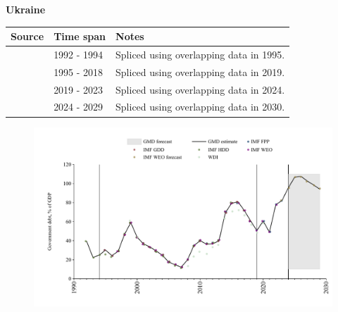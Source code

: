 \documentclass[12pt,a4paper,landscape]{article}
\begin{document}
\begin{adjustbox}{max totalsize={\paperwidth}{\paperheight},center}
\begin{minipage}[t][\textheight][t]{\textwidth}
\vspace*{0.5cm}
{}
\begin{center}
{\Large\bfseries Ukraine}
\end{center}
\vspace{0.5cm}
\begin{table}[H]
\centering
\small
\begin{tabular}{|l|l|l|}
\hline
\textbf{Source} & \textbf{Time span} & \textbf{Notes} \\
\hline
\rowcolor{white}\cite{IMF_HDD}& 1992 - 1994 &Spliced using overlapping data in 1995.\\
\rowcolor{lightgray}\cite{IMF_GDD}& 1995 - 2018 &Spliced using overlapping data in 2019.\\
\rowcolor{white}\cite{IMF_FPP}& 2019 - 2023 &Spliced using overlapping data in 2024.\\
\rowcolor{lightgray}\cite{IMF_WEO_forecast}& 2024 - 2029 &Spliced using overlapping data in 2030.\\
\hline
\end{tabular}
\end{table}
\begin{figure}[H]
\centering
\includegraphics[width=\textwidth,height=0.6\textheight,keepaspectratio]{graphs/UKR_govdebt_GDP.pdf}
\end{figure}
\end{minipage}
\end{adjustbox}
\end{document}
